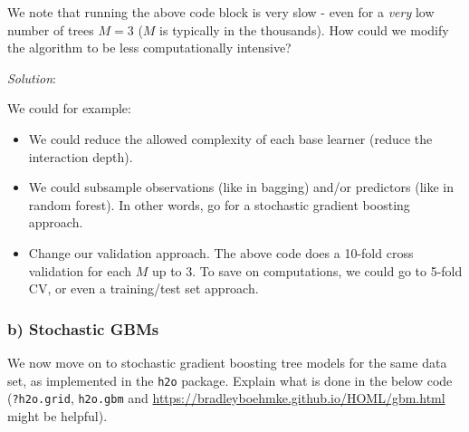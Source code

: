 \documentclass[
]{article}
\providecommand{\tightlist}{%
  \setlength{\itemsep}{0pt}\setlength{\parskip}{0pt}}
\begin{document}
We note that running the above code block is very slow - even for a
\emph{very} low number of trees \(M=3\) (\(M\) is typically in the
thousands). How could we modify the algorithm to be less computationally
intensive?

\emph{Solution}:

We could for example:

\begin{itemize}
\tightlist
\item
  We could reduce the allowed complexity of each base learner (reduce
  the interaction depth).
\item
  We could subsample observations (like in bagging) and/or predictors
  (like in random forest). In other words, go for a stochastic gradient
  boosting approach.
\item
  Change our validation approach. The above code does a 10-fold cross
  validation for each \(M\) up to \(3\). To save on computations, we
  could go to 5-fold CV, or even a training/test set approach.
\end{itemize}

\subsubsection{b) Stochastic GBMs}\label{b-stochastic-gbms}

We now move on to stochastic gradient boosting tree models for the same
data set, as implemented in the \texttt{h2o} package. Explain what is
done in the below code (\texttt{?h2o.grid}, \texttt{h2o.gbm} and
\url{https://bradleyboehmke.github.io/HOML/gbm.html} might be helpful).
\end{document}
